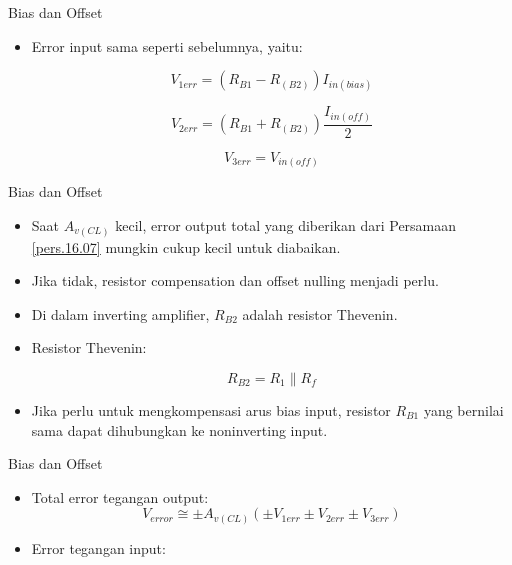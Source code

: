 \begin{frame}[t]{Bias dan Offset}
	\begin{itemize}
		\item Error input sama seperti sebelumnya, yaitu:
		
		\begin{equation}\label{pers.16.8}
			V_{1err} = (R_{B1} - R_{(B2)}) I_{in(bias)}
		\end{equation}
	
		\begin{equation}\label{pers.16.9}
			V_{2err} = (R_{B1} + R_{(B2)}) \frac{I_{in(off)}}{2}
		\end{equation}
	
		\begin{equation}\label{pers.16.10}
			V_{3err} = V_{in(off)}
		\end{equation}
	
	\end{itemize}
\end{frame}

\begin{frame}[t]{Bias dan Offset}
	\begin{itemize}
		\item Saat $ A_{v(CL)} $ kecil, error output total yang diberikan dari Persamaan \ref{pers.16.07} mungkin cukup kecil untuk diabaikan.
		\item Jika tidak, resistor compensation dan offset nulling menjadi perlu.
		\item Di dalam inverting amplifier, $ R_{B2} $ adalah resistor Thevenin.
		\item Resistor Thevenin:
		
		\begin{equation}\label{pers.16.11}
			R_{B2} = R_1 \parallel R_f
		\end{equation}

		\item Jika perlu untuk mengkompensasi arus bias input, resistor $ R_{B1} $ yang bernilai sama dapat dihubungkan ke noninverting input.
	\end{itemize}
\end{frame}

\begin{frame}[t]{Bias dan Offset}
	\begin{itemize}
		\item Total error tegangan output:
		\begin{equation}\label{fig-17.0.16.7}
			V_{error} \cong \pm A_{v(CL)} (\pm V_{1err} \pm V_{2err} \pm V_{3err} )
		\end{equation}
		\item Error tegangan input:

	\end{itemize}
\end{frame}


